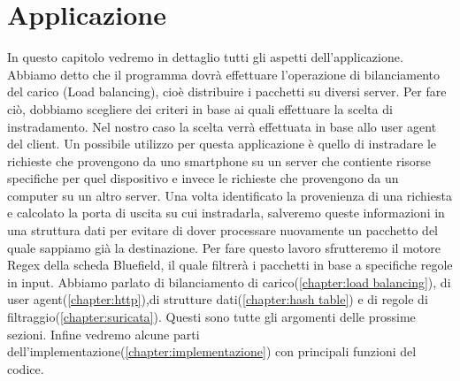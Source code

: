 \documentclass[binding=0.6cm]{sapthesis}
\theoremstyle{definition}
\begin{document}
\chapter{Applicazione}
In questo capitolo vedremo in dettaglio tutti gli aspetti dell'applicazione.
Abbiamo detto che il programma dovrà effettuare l'operazione di bilanciamento del 
carico (Load balancing), cioè distribuire i pacchetti su diversi server.
Per fare ciò, dobbiamo scegliere dei criteri in base ai quali effettuare la scelta di instradamento.
Nel nostro caso la scelta verrà effettuata in base allo user agent del client.
Un possibile utilizzo per questa applicazione è quello di instradare le richieste che provengono
da uno smartphone su un server che contiente risorse specifiche per quel dispositivo e invece
le richieste che provengono da un computer su un altro server.
Una volta identificato la provenienza di una richiesta e calcolato la porta di uscita su cui 
instradarla, salveremo queste informazioni in una struttura dati per evitare di dover processare
nuovamente un pacchetto del quale sappiamo già la destinazione.
Per fare questo lavoro sfrutteremo il motore Regex della scheda Bluefield, il quale filtrerà i
pacchetti in base a specifiche regole in input.
Abbiamo parlato di bilanciamento di carico(\ref{chapter:load balancing}), 
di user agent(\ref{chapter:http}),di strutture dati(\ref{chapter:hash table}) e
di regole di filtraggio(\ref{chapter:suricata}). 
Questi sono tutte gli argomenti delle prossime sezioni. 
Infine vedremo alcune parti dell'implementazione(\ref{chapter:implementazione}) con principali funzioni del codice.


\end{document}
